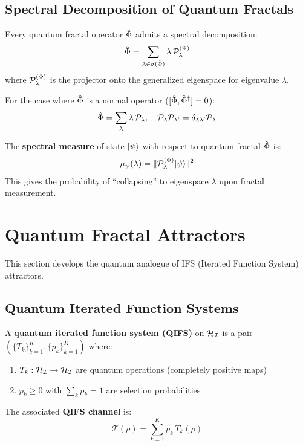 \subsection{Spectral Decomposition of Quantum Fractals}

\begin{theorem}
\label{thm:qfractal-spectral}
Every quantum fractal operator $\hat{\Phi}$ admits a spectral decomposition:
\[
\hat{\Phi} = \sum_{\lambda \in \sigma(\hat{\Phi})} \lambda \, \mathcal{P}_\lambda^{(\Phi)}
\]
where $\mathcal{P}_\lambda^{(\Phi)}$ is the projector onto the generalized eigenspace for eigenvalue $\lambda$.

For the case where $\hat{\Phi}$ is a normal operator ($[\hat{\Phi}, \hat{\Phi}^\dagger] = 0$):
\[
\hat{\Phi} = \sum_{\lambda} \lambda \, \mathcal{P}_\lambda, \quad \mathcal{P}_\lambda \mathcal{P}_{\lambda'} = \delta_{\lambda\lambda'} \mathcal{P}_\lambda
\]
\end{theorem}

\begin{definition}
\label{def:fractal-spectral-measure}
The \textbf{spectral measure} of state $|\psi\rangle$ with respect to quantum fractal $\hat{\Phi}$ is:
\[
\mu_\psi(\lambda) = \|\mathcal{P}_\lambda^{(\Phi)}|\psi\rangle\|^2
\]
This gives the probability of ``collapsing'' to eigenspace $\lambda$ upon fractal measurement.
\end{definition}

\section{Quantum Fractal Attractors}
\label{sec:quantum-attractors}

This section develops the quantum analogue of IFS (Iterated Function System) attractors.

\subsection{Quantum Iterated Function Systems}

\begin{definition}
\label{def:quantum-ifs}
A \textbf{quantum iterated function system (QIFS)} on $\mathcal{H}_{\mathcal{I}}$ is a pair $(\{T_k\}_{k=1}^K, \{p_k\}_{k=1}^K)$ where:
\begin{enumerate}
  \item $T_k : \mathcal{H}_{\mathcal{I}} \to \mathcal{H}_{\mathcal{I}}$ are quantum operations (completely positive maps)
  \item $p_k \geq 0$ with $\sum_k p_k = 1$ are selection probabilities
\end{enumerate}
The associated \textbf{QIFS channel} is:
\[
\mathcal{T}(\rho) = \sum_{k=1}^{K} p_k \, T_k(\rho)
\]
\end{definition}

